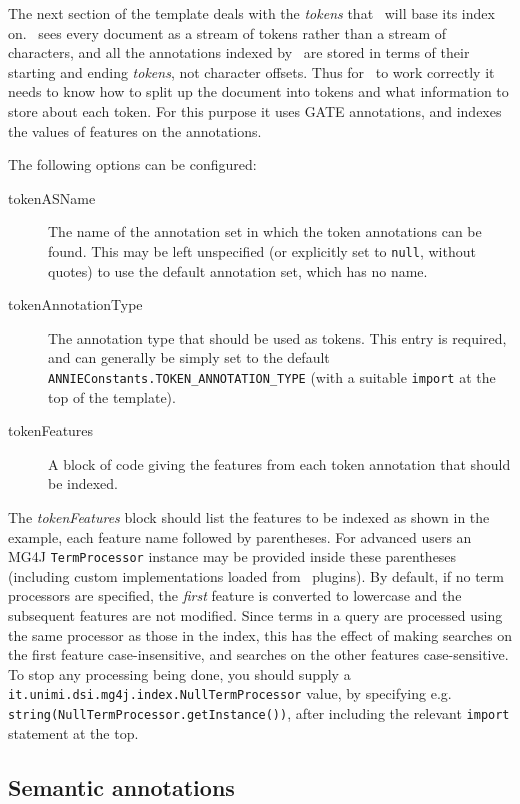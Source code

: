 The next section of the template deals with the {\em tokens} that \Mimir\ will
base its index on.  \Mimir\ sees every document as a stream of tokens rather
than a stream of characters, and all the annotations indexed by \Mimir\ are
stored in terms of their starting and ending {\em tokens}, not character
offsets.  Thus for \Mimir\ to work correctly it needs to know how to split up
the document into tokens and what information to store about each token.  For
this purpose it uses GATE annotations, and indexes the values of features on
the annotations.

The following options can be configured:
\begin{description}
\item[tokenASName] The name of the annotation set in which the token
  annotations can be found.  This may be left unspecified (or explicitly set to
  \lstinline!null!, without quotes) to use the default annotation set, which
  has no name.
\item[tokenAnnotationType] The annotation type that should be used as tokens.
  This entry is required, and can generally be simply set to the default
  \lstinline!ANNIEConstants.TOKEN_ANNOTATION_TYPE! (with a suitable
  \lstinline!import! at the top of the template).
\item[tokenFeatures] A block of code giving the features from each token
  annotation that should be indexed.
\end{description}

The {\em tokenFeatures} block should list the features to be indexed as shown
in the example, each feature name followed by parentheses.  For advanced users
an MG4J \lstinline!TermProcessor! instance may be provided inside these
parentheses (including custom implementations loaded from \Mimir\ plugins).  By
default, if no term processors are specified, the {\em first} feature is
converted to lowercase and the subsequent features are not modified.  Since
terms in a query are processed using the same processor as those in the index,
this has the effect of making searches on the first feature case-insensitive,
and searches on the other features case-sensitive. To stop any processing
being done, you should supply a
\lstinline!it.unimi.dsi.mg4j.index.NullTermProcessor! value, by specifying e.g.
\lstinline!string(NullTermProcessor.getInstance())!, after including the
relevant \lstinline!import! statement at the top.

\subsection*{Semantic annotations}\label{sec:indexing:helpers}

